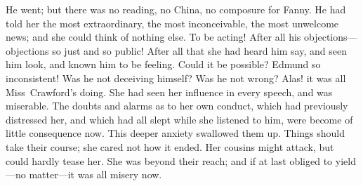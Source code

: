 He went; but there was no reading, no China, no composure for Fanny. He had told her the most extraordinary, the most inconceivable, the most unwelcome news; and she could think of nothing else. To be acting! After all his objections—objections so just and so public! After all that she had heard him say, and seen him look, and known him to be feeling. Could it be possible? Edmund so inconsistent! Was he not deceiving himself? Was he not wrong? Alas! it was all Miss~Crawford's doing. She had seen her influence in every speech, and was miserable. The doubts and alarms as to her own conduct, which had previously distressed her, and which had all slept while she listened to him, were become of little consequence now. This deeper anxiety swallowed them up. Things should take their course; she cared not how it ended. Her cousins might attack, but could hardly tease her. She was beyond their reach; and if at last obliged to yield—no matter—it was all misery now. 